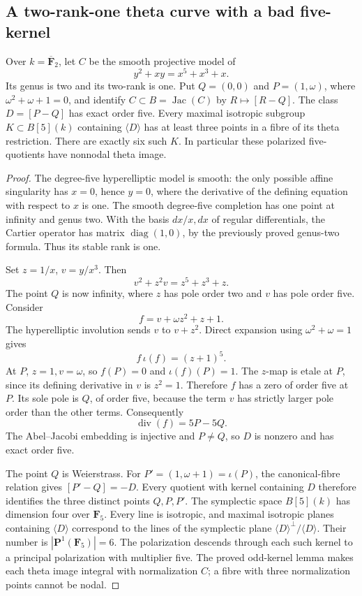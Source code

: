 \subsection{A two-rank-one theta curve with a bad five-kernel}

\begin{proposition}
\label{prop:root-f1-bad-five-kernel}
Over $k=\overline{\mathbf F}_2$, let $C$ be the smooth projective
model of
\[
                 y^2+xy=x^5+x^3+x.
\]
Its genus is two and its two-rank is one. Put $Q=(0,0)$ and
$P=(1,\omega)$, where $\omega^2+\omega+1=0$, and identify
$C\subset B=\operatorname{Jac}(C)$ by $R\mapsto[R-Q]$.
The class $D=[P-Q]$ has exact order five. Every maximal isotropic
subgroup $K\subset B[5](k)$ containing $\langle D\rangle$
has at least three points in a fibre of its theta restriction.
There are exactly six such $K$. In particular these polarized
five-quotients have nonnodal theta image.
\end{proposition}
\begin{proof}
The degree-five hyperelliptic model is smooth: the only possible
affine singularity has $x=0$, hence $y=0$, where the derivative
of the defining equation with respect to $x$ is one. The smooth
degree-five completion has one point at infinity and genus two.
With the basis $dx/x,dx$ of regular differentials, the Cartier
operator has matrix $\operatorname{diag}(1,0)$, by the previously
proved genus-two formula. Thus its stable rank is one.

Set $z=1/x$, $v=y/x^3$. Then
\[
             v^2+z^2v=z^5+z^3+z.
\]
The point $Q$ is now infinity, where $z$ has pole order two and
$v$ has pole order five. Consider
\[
              f=v+\omega z^2+z+1.
\]
The hyperelliptic involution sends $v$ to $v+z^2$. Direct expansion
using $\omega^2+\omega=1$ gives
\[
      f\,\iota(f)=(z+1)^5.
\]
At $P$, $z=1,v=\omega$, so $f(P)=0$ and $\iota(f)(P)=1$.
The $z$-map is etale at $P$, since its defining derivative in
$v$ is $z^2=1$. Therefore $f$ has a zero of order five at $P$.
Its sole pole is $Q$, of order five, because the term $v$ has
strictly larger pole order than the other terms. Consequently
\[
                   \operatorname{div}(f)=5P-5Q.
\]
The Abel--Jacobi embedding is injective and $P\ne Q$, so $D$ is
nonzero and has exact order five.

The point $Q$ is Weierstrass. For $P'=(1,\omega+1)=\iota(P)$,
the canonical-fibre relation gives $[P'-Q]=-D$.
Every quotient with kernel containing $D$ therefore identifies
the three distinct points $Q,P,P'$. The symplectic space $B[5](k)$
has dimension four over $\mathbf F_5$. Every line is isotropic,
and maximal isotropic planes containing $\langle D\rangle$
correspond to the lines of the symplectic plane
$\langle D\rangle^\perp/\langle D\rangle$. Their number is
$|\mathbf P^1(\mathbf F_5)|=6$. The polarization descends through
each such kernel to a principal polarization with multiplier five.
The proved odd-kernel lemma makes each theta image integral with
normalization $C$; a fibre with three normalization points cannot
be nodal.
\end{proof}

